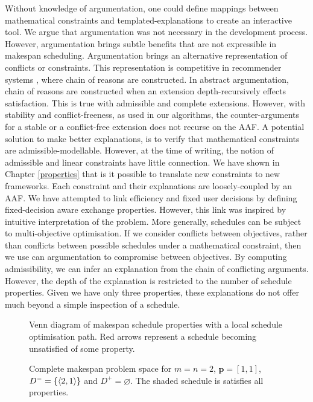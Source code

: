 Without knowledge of argumentation, one could define mappings between mathematical constraints and templated-explanations to create an interactive tool. We argue that argumentation was not necessary in the development process. However, argumentation brings subtle benefits that are not expressible in makespan scheduling.
\linespace
Argumentation brings an alternative representation of conflicts or constraints. This representation is competitive in recommender systems \cite{recommend}, where chain of reasons are constructed. In abstract argumentation, chain of reasons are constructed when an extension depth-recursively effects satisfaction. This is true with admissible and complete extensions. However, with stability and conflict-freeness, as used in our algorithms, the counter-arguments for a stable or a conflict-free extension does not recurse on the AAF. A potential solution to make better explanations, is to verify that mathematical constraints are admissible-modellable. However, at the time of writing, the notion of admissible and linear constraints have little connection. 
\linespace
We have shown in Chapter \ref{properties} that is it possible to translate new constraints to new frameworks. Each constraint and their explanations are loosely-coupled by an AAF. We have attempted to link efficiency and fixed user decisions by defining fixed-decision aware exchange properties. However, this link was inspired by intuitive interpretation of the problem. More generally, schedules can be subject to multi-objective optimisation. If we consider conflicts between objectives, rather than conflicts between possible schedules under a mathematical constraint, then we use can argumentation to compromise between objectives. By computing admissibility, we can infer an explanation from the chain of conflicting arguments. However, the depth of the explanation is restricted to the number of schedule properties. Given we have only three properties, these explanations do not offer much beyond a simple inspection of a schedule.

\begin{figure}
	\label{problempath}
	
	\caption{Venn diagram of makespan schedule properties with a local schedule optimisation path. Red arrows represent a schedule becoming unsatisfied of some property.}
\end{figure}



\begin{figure}
	\label{problemspace}
	
	\caption{Complete makespan problem space for $m=n=2$, $\mathbf{p}=[1,1]$, $D^-=\{\langle{2},{1}\rangle\}$ and $D^+=\varnothing$. The shaded schedule is satisfies all properties.}
\end{figure}

